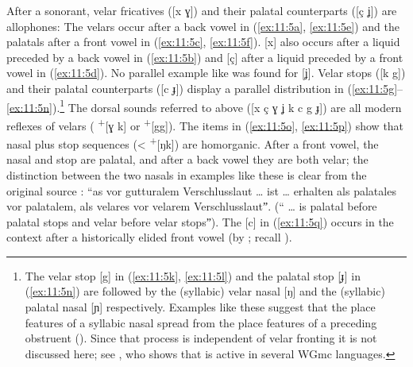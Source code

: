 After a sonorant, velar fricatives ([x ɣ]) and their palatal counterparts ([ç ʝ]) are allophones: The velars occur after a back vowel in (\ref{ex:11:5a}, \ref{ex:11:5e}) and the palatals after a front vowel in (\ref{ex:11:5c}, \ref{ex:11:5f}). [x] also occurs after a liquid preceded by a back vowel in (\ref{ex:11:5b}) and [ç] after a liquid preceded by a front vowel in (\ref{ex:11:5d}). No parallel example like  was found for [ʝ]. Velar stops ([k g]) and their palatal counterparts ([c ɟ]) display a parallel distribution in (\ref{ex:11:5g}--\ref{ex:11:5n}).\footnote{\label{fn:11:3}The velar stop [g] in (\ref{ex:11:5k}, \ref{ex:11:5l}) and the palatal stop [ɟ] in (\ref{ex:11:5n}) are followed by the (syllabic) velar nasal [ŋ] and the (syllabic) palatal nasal [ɲ] respectively. Examples like these suggest that the place features of a syllabic nasal spread from the place features of a preceding obstruent (). Since that process is independent of velar fronting it is not discussed here; see \citet{Hall2020}, who shows that  is active in several WGmc languages.} The dorsal sounds referred to above ([x ç ɣ ʝ k c g ɟ]) are all modern reflexes of velars ( \textsuperscript{+}[ɣ k] or \textsuperscript{+}[gg]). The items in (\ref{ex:11:5o}, \ref{ex:11:5p}) show that nasal plus stop sequences (< \textsuperscript{+}[ŋk]) are homorganic. After a front vowel, the nasal and stop are palatal, and after a back vowel they are both velar; the distinction between the two nasals in examples like these is clear from the original source \citep[147]{Kolz1914}: “as  vor gutturalem Verschlusslaut … ist … erhalten als palatales  vor palatalem, als velares  vor velarem Verschlusslautˮ.  (“  … is palatal  before palatal stops and velar  before velar stopsˮ). The [c] in (\ref{ex:11:5q}) occurs in the context after a historically elided front vowel (by ; recall ).\largerpage

